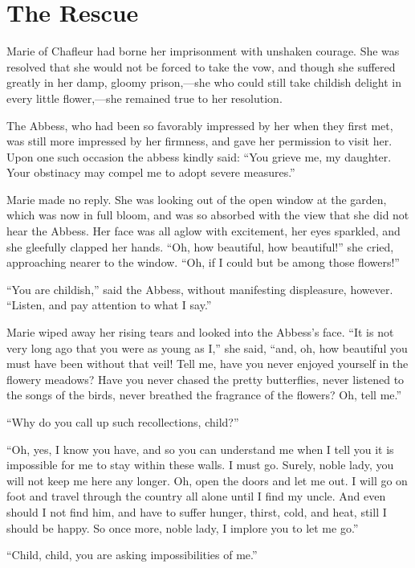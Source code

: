 \chapter{The Rescue}

\drop Marie of Chafleur had borne her imprisonment with unshaken
courage. She was resolved that she would not be forced to take the vow,
and though she suffered greatly in her damp, gloomy prison,---she who
could still take childish delight in every little flower,---she remained
true to her resolution.

The Abbess, who had been so favorably impressed by her when they first
met, was still more impressed by her firmness, and gave her permission
to visit her. Upon one such occasion the abbess kindly said: ``You
grieve me, my daughter. Your obstinacy may compel me to adopt severe
measures.''

Marie made no reply. She was looking out of the open window at the
garden, which was now in full bloom, and was so absorbed with the view
that she did not hear the Abbess. Her face was all aglow with
excitement, her eyes sparkled, and she gleefully clapped her hands.
``Oh, how beautiful, how beautiful!'' she cried, approaching nearer to
the window. ``Oh, if I could but be among those flowers!''

``You are childish,'' said the Abbess, without manifesting displeasure,
however. ``Listen, and pay attention to what I say.''

Marie wiped away her rising tears and looked into the Abbess's face.
``It is not very long ago that you were as young as I,'' she said,
``and, oh, how beautiful you must have been without that veil! Tell me,
have you never enjoyed yourself in the flowery meadows? Have you never
chased the pretty butterflies, never listened to the songs of the birds,
never breathed the fragrance of the flowers? Oh, tell me.''

``Why do you call up such recollections, child?''

``Oh, yes, I know you have, and so you can understand me when I tell you
it is impossible for me to stay within these walls. I must go. Surely,
noble lady, you will not keep me here any longer. Oh, open the doors and
let me out. I will go on foot and travel through the country all alone
until I find my uncle. And even should I not find him, and have to
suffer hunger, thirst, cold, and heat, still I should be happy. So once
more, noble lady, I implore you to let me go.''

``Child, child, you are asking impossibilities of me.''

